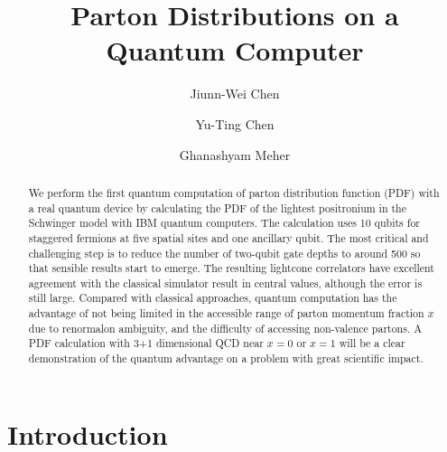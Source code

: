 \documentclass[aps,prd,twocolumn,tightenlines,superscriptaddress,
nofootinbib,preprintnumbers]{revtex4-1}
\begin{document}

\title{Parton Distributions on a Quantum Computer}
\author{Jiunn-Wei Chen}
\author{Yu-Ting Chen}
\author{Ghanashyam Meher}


\begin{abstract} 
We perform the first quantum computation of parton distribution function (PDF) with a real quantum device by calculating the PDF of the lightest positronium in the Schwinger model with IBM quantum computers. The calculation uses 10 qubits for staggered fermions at five spatial sites and one ancillary qubit. The most critical and challenging step is to reduce the number of two-qubit gate depths to around 500 so that sensible results start to emerge. 
The resulting lightcone correlators have excellent agreement with the classical simulator result in central values, although the error is still large.
Compared with classical approaches, quantum computation has the advantage of not being limited in the accessible range of parton momentum fraction $x$ due to renormalon ambiguity, and the difficulty of accessing non-valence partons. A PDF calculation with 3+1 dimensional QCD near $x=0$ or $x=1$ will be a clear demonstration of the quantum advantage on a problem with great scientific impact. 

\end{abstract}

\maketitle
\section{Introduction}
\end{document}
